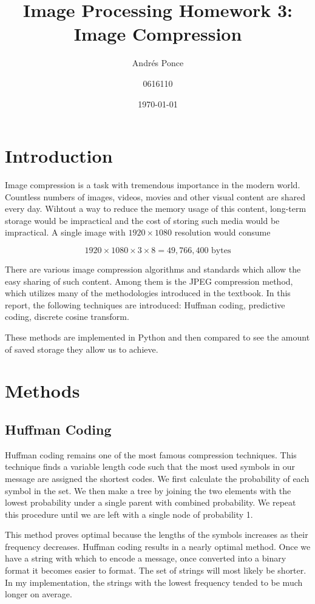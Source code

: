 \documentclass{article}
\title{Image Processing Homework 3: Image Compression}
\author{Andr\'es Ponce \\
\and
0616110}
\date{\today}
\begin{document}
\maketitle
\section{Introduction}
Image compression is a task with tremendous importance in the modern world. Countless numbers
of images, videos, movies and other visual  content are shared every day. Wihtout a way to reduce 
the memory usage of this content, long-term storage would be impractical and the cost of storing
such media would be impractical. A single image with $1920\times1080$ resolution would consume

\[1920 \times 1080 \times 3 \times 8 = 49,766,400 \textrm{ bytes}\]

There are various image compression algorithms and standards which allow the easy sharing of such 
content. Among them is the JPEG compression method, which utilizes many of the methodologies 
introduced in the textbook. In this report, the following techniques are introduced: Huffman coding,
predictive coding, discrete cosine transform.

These methods are implemented in Python and then compared to see the amount of saved storage they 
allow us to achieve.

\section{Methods}
\subsection{Huffman Coding}
Huffman coding remains one of the most famous compression techniques.  This technique finds a 
variable length code such that the most used symbols in our message are assigned the shortest
codes. We first calculate the probability of each symbol in the set. We then make a tree by 
joining the two elements with the lowest probability under a single parent with combined
probability. We repeat this procedure until we are left with a single node of probability 1.

This method proves optimal because the lengths of the symbols increases as their frequency
decreases. Huffman coding results in a nearly optimal method. Once we have a string with which
to encode a message, once converted into a binary format it becomes easier to format. The 
set of strings will most likely be shorter. In my implementation, the strings with the lowest
frequency tended to be much longer on average. 
\end{document}
